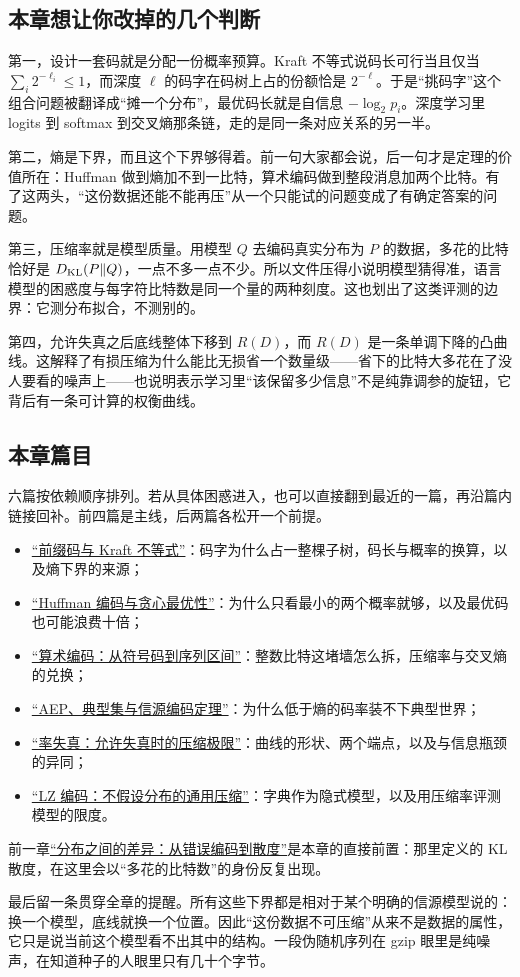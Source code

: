 \subsection{本章想让你改掉的几个判断}

第一，设计一套码就是分配一份概率预算。Kraft 不等式说码长可行当且仅当 \(\sum_i 2^{-\ell_i}\le1\)，而深度 \(\ell\) 的码字在码树上占的份额恰是 \(2^{-\ell}\)。于是``挑码字''这个组合问题被翻译成``摊一个分布''，最优码长就是自信息 \(-\log_2 p_i\)。深度学习里 logits 到 softmax 到交叉熵那条链，走的是同一条对应关系的另一半。

第二，熵是下界，而且这个下界够得着。前一句大家都会说，后一句才是定理的价值所在：Huffman 做到熵加不到一比特，算术编码做到整段消息加两个比特。有了这两头，``这份数据还能不能再压''从一个只能试的问题变成了有确定答案的问题。

第三，压缩率就是模型质量。用模型 \(Q\) 去编码真实分布为 \(P\) 的数据，多花的比特恰好是 \(D_{\mathrm{KL}}(P\|Q)\)，一点不多一点不少。所以文件压得小说明模型猜得准，语言模型的困惑度与每字符比特数是同一个量的两种刻度。这也划出了这类评测的边界：它测分布拟合，不测别的。

第四，允许失真之后底线整体下移到 \(R(D)\)，而 \(R(D)\) 是一条单调下降的凸曲线。这解释了有损压缩为什么能比无损省一个数量级——省下的比特大多花在了没人要看的噪声上——也说明表示学习里``该保留多少信息''不是纯靠调参的旋钮，它背后有一条可计算的权衡曲线。

\subsection{本章篇目}

六篇按依赖顺序排列。若从具体困惑进入，也可以直接翻到最近的一篇，再沿篇内链接回补。前四篇是主线，后两篇各松开一个前提。

\begin{itemize}
\tightlist
\item \hyperref[sec:07-Information-Theory/04-Source-Coding/01]{``前缀码与 Kraft 不等式''}：码字为什么占一整棵子树，码长与概率的换算，以及熵下界的来源；
\item \hyperref[sec:07-Information-Theory/04-Source-Coding/02]{``Huffman 编码与贪心最优性''}：为什么只看最小的两个概率就够，以及最优码也可能浪费十倍；
\item \hyperref[sec:07-Information-Theory/04-Source-Coding/03]{``算术编码：从符号码到序列区间''}：整数比特这堵墙怎么拆，压缩率与交叉熵的兑换；
\item \hyperref[sec:07-Information-Theory/04-Source-Coding/04]{``AEP、典型集与信源编码定理''}：为什么低于熵的码率装不下典型世界；
\item \hyperref[sec:07-Information-Theory/04-Source-Coding/05]{``率失真：允许失真时的压缩极限''}：曲线的形状、两个端点，以及与信息瓶颈的异同；
\item \hyperref[sec:07-Information-Theory/04-Source-Coding/06]{``LZ 编码：不假设分布的通用压缩''}：字典作为隐式模型，以及用压缩率评测模型的限度。
\end{itemize}

前一章\hyperref[ch:056]{``分布之间的差异：从错误编码到散度''}是本章的直接前置：那里定义的 KL 散度，在这里会以``多花的比特数''的身份反复出现。

最后留一条贯穿全章的提醒。所有这些下界都是相对于某个明确的信源模型说的：换一个模型，底线就换一个位置。因此``这份数据不可压缩''从来不是数据的属性，它只是说当前这个模型看不出其中的结构。一段伪随机序列在 gzip 眼里是纯噪声，在知道种子的人眼里只有几十个字节。
